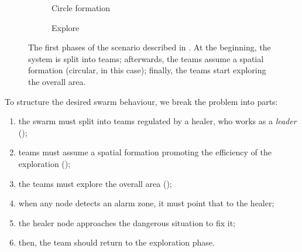 \begin{figure}[t]
\begin{subfigure}{0.29\textwidth}
  \caption{Circle formation}
  \label{coordination2023-macro:fig:circle-formation}
\end{subfigure}
\hfill
\begin{subfigure}{0.29\textwidth}
  \centering
  \caption{Explore}
  \label{coordination2023-macro:fig:explore}
\end{subfigure}
\caption[\MacroSwarm{} graphical simulations example]{The first phases of the scenario described in . 
 At the beginning, the system is split into teams; 
 afterwards, the teams assume a spatial formation (circular, in this case);
 finally, the teams start exploring the overall area.}\label{coordination2023-macro:fig:scenario}
\end{figure}
To structure the desired swarm behaviour, 
 we break the problem into parts:
\begin{enumerate}
  \item the swarm must split into teams regulated by a healer, who works as a \emph{leader} 
   ();
  \item teams must assume a spatial formation promoting the efficiency of the exploration ();
  \item the teams must explore the overall area ();
  \item when any node detects an alarm zone, it must point that to the healer;
  \item the healer node approaches the dangerous situation to fix it;
  \item then, the team should return to the exploration phase.
\end{enumerate}
